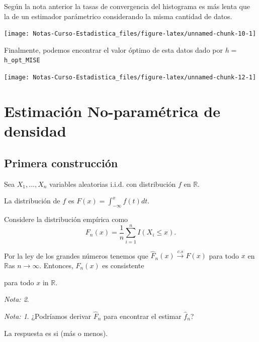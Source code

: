 \documentclass[
  12pt,
]{book}
\theoremstyle{definition}
\theoremstyle{definition}
\theoremstyle{definition}
\theoremstyle{remark}
\newtheorem*{remark}{Nota: }
\begin{document}
Según la nota anterior la tasas de convergencia del histograma es más lenta que la de un estimador parámetrico considerando la misma cantidad de datos.

\begin{center}\texttt{[image: Notas-Curso-Estadistica\_files/figure-latex/unnamed-chunk-10-1]} \end{center}

Finalmente, podemos encontrar el valor óptimo de esta datos dado por \(h=\)\texttt{h\_opt\_MISE}

\begin{center}\texttt{[image: Notas-Curso-Estadistica\_files/figure-latex/unnamed-chunk-12-1]} \end{center}

\hypertarget{estimaciuxf3n-no-paramuxe9trica-de-densidad}{%
\section{Estimación No-paramétrica de densidad}\label{estimaciuxf3n-no-paramuxe9trica-de-densidad}}

\hypertarget{primera-construcciuxf3n}{%
\subsection{Primera construcción}\label{primera-construcciuxf3n}}

Sea \(X_{1},\ldots,X_{n}\) variables aleatorias i.i.d. con distribución \(f\) en \(\mathbb{R}\).

La distribución de \(f\) es \(F(x)=\int_{-\infty}^{x}f(t)dt\).

Considere la distribución empírica como
\[
F_{n}(x)=\frac{1}{n}\sum_{i=1}^{n}I(X_{i}\leq x).
\]

Por la ley de los grandes números tenemos que \(\hat{F}_{n}(x) \xrightarrow{c.s} F(x)\) para todo \(x\) en \(\mathbb{R}\)as
\(n\rightarrow\infty\). Entonces, \(F_{n}(x)\) es consistente

para todo \(x\) in \(\mathbb{R}\).

\begin{remark}
\begin{remark}

{}¿Podríamos derivar \(\hat{F}_n\) para encontrar el estimar \(\hat{f}_n\)?

\end{remark}
\end{remark}

La respuesta es si (más o menos).
\end{document}
